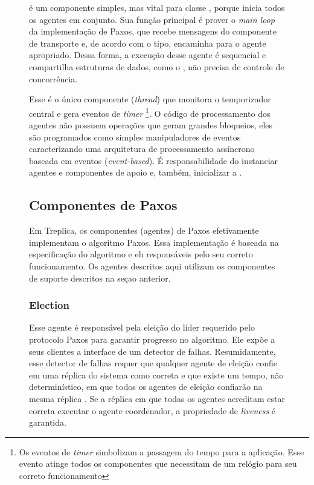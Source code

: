 \begin{figure}[ht]
 é um componente simples, mas vital para classe
, porque inicia todos os agentes em conjunto. Sua função
principal é prover o \emph{main loop} da implementação de Paxos, que recebe mensagens do
componente de transporte e, de acordo com o tipo, encaminha para o agente apropriado.
Dessa forma, a execução desse agente é sequencial e compartilha estruturas de dados, como
o , não precisa de controle de concorrência.

Esse é o único componente (\emph{thread}) que monitora o temporizador central e gera
eventos de \emph{timer} \footnote{Os eventos de \emph{timer} simbolizam a passagem do
tempo para a aplicação. Esse evento atinge todos os componentes que necessitam de um
relógio para seu correto funcionamento}. O código de processamento dos agentes não possuem
operações que geram grandes bloqueios, eles são programados como simples manipuladores de
eventos caracterizando uma arquitetura de processamento assíncrono baseada em eventos
(\emph{event-based}). É responsabilidade do  instanciar agentes e
componentes de apoio e, também, inicializar a .

\subsection{Componentes de Paxos}

Em Treplica, os componentes (agentes) de Paxos efetivamente implementam o algoritmo Paxos.
Essa implementação é baseada na especificação do algoritmo e eh responsáveis pelo seu
correto funcionamento. Os agentes descritos aqui utilizam os componentes de suporte
descritos na seçao anterior.

\subsubsection{Election}

Esse agente é responsável pela eleição do líder requerido pelo protocolo Paxos para
garantir progresso no algoritmo. Ele expõe a seus clientes a interface de um \Omega
detector de falhas. Resumidamente, esse detector de falhas requer que qualquer agente de
eleição confie em uma réplica do sistema como correta e que existe um tempo, não
determinístico, em que todos os agentes de eleição confiarão na mesma réplica
\cite{chandra96}. Se a réplica em que todas os agentes acreditam estar correta executar o
agente coordenador, a propriedade de \emph{liveness} é garantida.


\end{figure}
